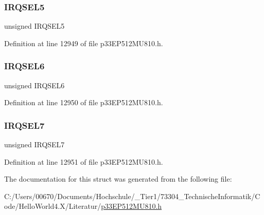 \subsubsection{\texorpdfstring{I\+R\+Q\+S\+E\+L5}{IRQSEL5}}
{\footnotesize\ttfamily unsigned I\+R\+Q\+S\+E\+L5}



Definition at line 12949 of file p33\+E\+P512\+M\+U810.\+h.

\mbox{\label{structtag_d_m_a4_r_e_q_b_i_t_s_ace52408ef8c29561f3c56a3fbcbc8217}} 
\subsubsection{\texorpdfstring{I\+R\+Q\+S\+E\+L6}{IRQSEL6}}
{\footnotesize\ttfamily unsigned I\+R\+Q\+S\+E\+L6}



Definition at line 12950 of file p33\+E\+P512\+M\+U810.\+h.

\mbox{\label{structtag_d_m_a4_r_e_q_b_i_t_s_acce7dedecdf1f53cdbead3edf7c5d53a}} 
\subsubsection{\texorpdfstring{I\+R\+Q\+S\+E\+L7}{IRQSEL7}}
{\footnotesize\ttfamily unsigned I\+R\+Q\+S\+E\+L7}



Definition at line 12951 of file p33\+E\+P512\+M\+U810.\+h.



The documentation for this struct was generated from the following file\+:\begin{DoxyCompactItemize}
\item 
C\+:/\+Users/00670/\+Documents/\+Hochschule/\+\_\+\+Tier1/73304\+\_\+\+Technische\+Informatik/\+Code/\+Hello\+World4.\+X/\+Literatur/\hyperlink{p33_e_p512_m_u810_8h}{p33\+E\+P512\+M\+U810.\+h}\end{DoxyCompactItemize}

